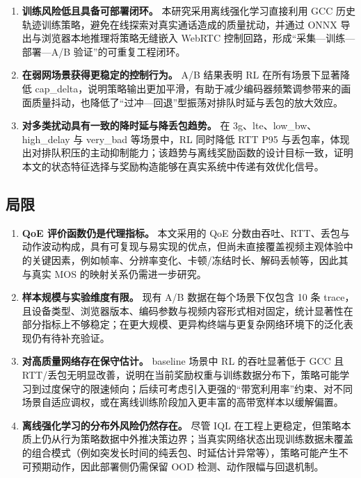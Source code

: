 \begin{enumerate}
    \item \textbf{训练风险低且具备可部署闭环。} 本研究采用离线强化学习直接利用 GCC 历史轨迹训练策略，避免在线探索对真实通话造成的质量扰动，并通过 ONNX 导出与浏览器本地推理将策略无缝嵌入 WebRTC 控制回路，形成“采集—训练—部署—A/B 验证”的可重复工程闭环。
    \item \textbf{在弱网场景获得更稳定的控制行为。} A/B 结果表明 RL 在所有场景下显著降低 cap\_delta，说明策略输出更加平滑，有助于减少编码器频繁调参带来的画面质量抖动，也降低了“过冲—回退”型振荡对排队时延与丢包的放大效应。
    \item \textbf{对多类扰动具有一致的降时延与降丢包趋势。} 在 3g、lte、low\_bw、high\_delay 与 very\_bad 等场景中，RL 同时降低 RTT P95 与丢包率，体现出对排队积压的主动抑制能力；该趋势与离线奖励函数的设计目标一致，证明本文的状态特征选择与奖励构造能够在真实系统中传递有效优化信号。
\end{enumerate}

\subsection{局限}

\begin{enumerate}
    \item \textbf{QoE 评价函数仍是代理指标。} 本文采用的 QoE 分数由吞吐、RTT、丢包与动作波动构成，具有可复现与易实现的优点，但尚未直接覆盖视频主观体验中的关键因素，例如帧率、分辨率变化、卡顿/冻结时长、解码丢帧等，因此其与真实 MOS 的映射关系仍需进一步研究。
    \item \textbf{样本规模与实验维度有限。} 现有 A/B 数据在每个场景下仅包含 10 条 trace，且设备类型、浏览器版本、编码参数与视频内容形式相对固定，统计显著性在部分指标上不够稳定；在更大规模、更异构终端与更复杂网络环境下的泛化表现仍有待补充验证。
    \item \textbf{对高质量网络存在保守估计。} baseline 场景中 RL 的吞吐显著低于 GCC 且 RTT/丢包无明显改善，说明在当前奖励权重与训练数据分布下，策略可能学习到过度保守的限速倾向；后续可考虑引入更强的“带宽利用率”约束、对不同场景自适应调权，或在离线训练阶段加入更丰富的高带宽样本以缓解偏置。
    \item \textbf{离线强化学习的分布外风险仍然存在。} 尽管 IQL 在工程上更稳定，但策略本质上仍从行为策略数据中外推决策边界；当真实网络状态出现训练数据未覆盖的组合模式（例如突发长时间的纯丢包、时延估计异常等），策略可能产生不可预期动作，因此部署侧仍需保留 OOD 检测、动作限幅与回退机制。
\end{enumerate}

